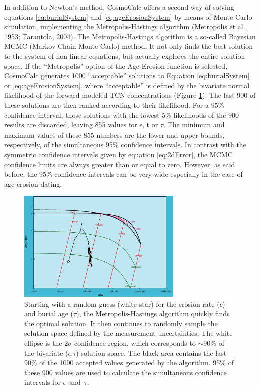 \documentclass{article}
\begin{document}
In  addition to  Newton's method,  CosmoCalc  offers a  second way  of
solving equations  \ref{eq:burialSystem} and \ref{eq:ageErosionSystem}
by    means   of    Monte   Carlo    simulation,    implementing   the
Metropolis-Hastings  algorithm (Metropolis  et  al., 1953;  Tarantola,
2004). The Metropolis-Hastings algorithm  is a so-called Bayesian MCMC
(Markov Chain Monte Carlo) method. It not only finds the best solution
to  the system  of  non-linear equations,  but  actually explores  the
entire  solution   space.   If   the  ``Metropolis''  option   of  the
Age-Erosion   function   is   selected,   CosmoCalc   generates   1000
``acceptable''   solutions   to   Equation  \ref{eq:burialSystem}   or
\ref{eq:ageErosionSystem},  where  ``acceptable''  is defined  by  the
bivariate normal likelihood  of the forward-modeled TCN concentrations
(Figure \ref{fig:metropolisBanana}).  The  last 900 of these solutions
are then ranked  according to their likelihood. For  a 95\% confidence
interval, those solutions  with the lowest 5\% likelihoods  of the 900
results are discarded, leaving 855 values for $\epsilon$, t or $\tau$.
The minimum and maximum values of  these 855 numbers are the lower and
upper  bounds,  respectively,  of  the  simultaneous  95\%  confidence
intervals.  In contrast with  the symmetric confidence intervals given
by equation  \ref{eq:2dError}, the  MCMC confidence limits  are always
greater  than or equal  to zero.   However, as  said before,  the 95\%
confidence  intervals can  be  very  wide especially  in  the case  of
age-erosion  dating.

\begin{figure}[h]
  \centering
  \includegraphics[width=0.7\textwidth]{2006GC001530-f03_orig.eps}
  \caption{
    Starting with  a random  guess (white star)  for the  erosion rate
    ($\epsilon$)  and  burial  age ($\tau$),  the  Metropolis-Hastings
    algorithm quickly  finds the optimal solution.   It then continues
    to randomly  sample the solution space defined  by the measurement
    uncertainties.   The  white ellipse  is  the 2$\sigma$  confidence
    region,   which  corresponds  to   $\sim$90\%  of   the  bivariate
    ($\epsilon$,$\tau$) solution-space.   The black area  contains the
    last 90\% of the 1000  accepted values generated by the algorithm. 
    95\% of  these 900 values  are used to calculate  the simultaneous
    confidence intervals for $\epsilon$~and~$\tau$.}
  \label{fig:metropolisBanana}
\end{figure}
\end{document}
